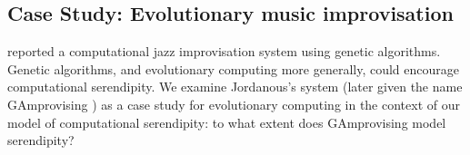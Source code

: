 
\subsection{Case Study: Evolutionary music improvisation} \label{sec:evomusic}

 reported a computational jazz improvisation system using genetic algorithms. Genetic algorithms, and evolutionary computing more generally, could encourage computational serendipity. We examine Jordanous's system (later given the name {\sf GAmprovising} \cite{jordanous:12}) as a case study for evolutionary computing in the context of our model of computational serendipity: to what extent does {\sf GAmprovising} model serendipity?

